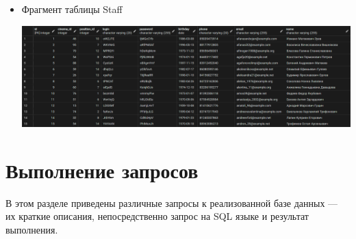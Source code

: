 \documentclass[a4paper,12pt]{article}
\renewcommand{\^}[2]{#1^{\, #2} \kern -1pt}
\newcommand{\1}{\kern 1pt}
\newcommand{\0}{\kern -1pt}
\begin{document}
\begin{itemize}
	
	\item Фрагмент таблицы Staff
	
	\includegraphics[scale=0.24,page=1]{Staff.png}
	
	
		
	\end{itemize}
	
	\newpage
	
	\section{Выполнение запросов}
	
	В этом разделе приведены различные запросы к реализованной базе данных — их краткие описания, непосредственно запрос на SQL языке и результат выполнения.
	
\end{document}
